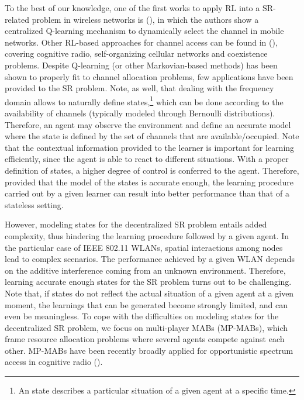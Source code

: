 \documentclass[preprint,12pt]{elsarticle}
\begin{document}
To the best of our knowledge, one of the first works to apply RL into a SR-related problem in wireless networks is (\citealp{nie1999q}), in which the authors show a centralized Q-learning mechanism to dynamically select the channel in mobile networks. Other RL-based approaches for channel access can be found in (\citealp{li2009multi, bennis2010q, bennis2011distributed, sallent2015learning, rupasinghe2015reinforcement}), covering cognitive radio, self-organizing cellular networks and coexistence problems. Despite Q-learning (or other Markovian-based methods) has been shown to properly fit to channel allocation problems, few applications have been provided to the SR problem. Note, as well, that dealing with the frequency domain allows to naturally define states,\footnote{An state describes a particular situation of a given agent at a specific time.} which can be done according to the availability of channels (typically modeled through Bernoulli distributions). Therefore, an agent may observe the environment and define an accurate model where the state is defined by the set of channels that are available/occupied. Note that the contextual information provided to the learner is important for learning efficiently, since the agent is able to react to different situations. With a proper definition of states, a higher degree of control is conferred to the agent. Therefore, provided that the model of the states is accurate enough, the learning procedure carried out by a given learner can result into better performance than that of a stateless setting. 

However, modeling states for the decentralized SR problem entails added complexity, thus hindering the learning procedure followed by a given agent. In the particular case of IEEE 802.11 WLANs, spatial interactions among nodes lead to complex scenarios. The performance achieved by a given WLAN depends on the additive interference coming from an unknown environment. Therefore, learning accurate enough states for the SR problem turns out to be challenging. Note that, if states do not reflect the actual situation of a given agent at a given moment, the learnings that can be generated become strongly limited, and can even be meaningless. To cope with the difficulties on modeling states for the decentralized SR problem, we focus on multi-player MABs (MP-MABs), which frame resource allocation problems where several agents compete against each other. MP-MABs have been recently broadly applied for opportunistic spectrum access in cognitive radio (\citealp{liu2010distributed, anandkumar2011distributed, rosenski2016multi, maghsudi2015joint, maghsudi2015channel}). 
\end{document}
